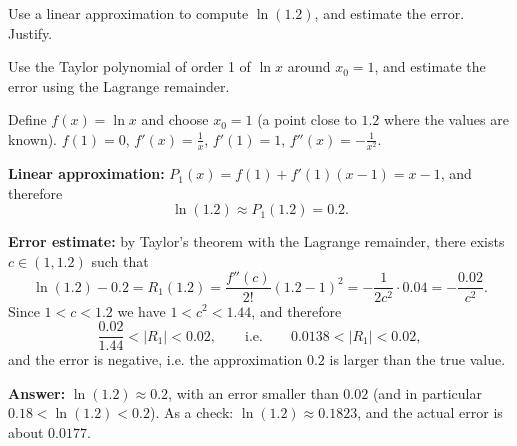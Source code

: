 
\begin{question}
Use a linear approximation to compute $\ln(1.2)$, and estimate the error. Justify.
\end{question}

\begin{hint}
Use the Taylor polynomial of order 1 of $\ln x$ around $x_0 = 1$, and estimate the error using the Lagrange remainder.
\end{hint}

\begin{solution}
Define $f(x) = \ln x$ and choose $x_0 = 1$ (a point close to $1.2$ where the values are known). $f(1) = 0$, $f'(x) = \frac1x$, $f'(1) = 1$, $f''(x) = -\frac{1}{x^2}$.

\textbf{Linear approximation:} $P_1(x) = f(1) + f'(1)(x - 1) = x - 1$, and therefore
\[ \ln(1.2) \approx P_1(1.2) = 0.2. \]

\textbf{Error estimate:} by Taylor's theorem with the Lagrange remainder, there exists $c\in(1, 1.2)$ such that
\[ \ln(1.2) - 0.2 = R_1(1.2) = \frac{f''(c)}{2!}(1.2 - 1)^2 = -\frac{1}{2c^2}\cdot 0.04 = -\frac{0.02}{c^2}. \]
Since $1 < c < 1.2$ we have $1 < c^2 < 1.44$, and therefore
\[ \frac{0.02}{1.44} < |R_1| < 0.02, \qquad\text{i.e.}\qquad 0.0138 < |R_1| < 0.02, \]
and the error is negative, i.e. the approximation $0.2$ is larger than the true value.

\textbf{Answer:} $\ln(1.2) \approx 0.2$, with an error smaller than $0.02$ (and in particular $0.18 < \ln(1.2) < 0.2$).
As a check: $\ln(1.2) \approx 0.1823$, and the actual error is about $0.0177$.
\end{solution}

